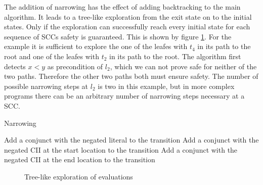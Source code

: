 The addition of narrowing has the effect of adding backtracking to the main algorithm.
It leads to a tree-like exploration from the exit state on to the initial states.
Only if the exploration can successfully reach every initial state for each sequence of SCCs safety is guaranteed.
This is shown by figure \ref{fig:backtrack}.
For the example it is sufficient to explore the one of the leafes with $t_4$ in its path to the root and one of the leafes with $t_2$ in its path to the root.
The algorithm first detects $x < y$ as precondition of $l_2$, which we can not prove safe for neither of the two paths.
Therefore the other two paths both must ensure safety.
The number of possible narrowing steps at $l_2$ is two in this example, but in more complex programs there can be an arbitrary number of narrowing steps necessary at a SCC.

\begin{algorithm}
\caption{Narrowing}\label{narrowing}
\begin{algorithmic}[1]
        \State Add a conjunct with the negated literal to the transition
      \EndIf
    \EndFor
  \EndFor
    \State Add a conjunct with the negated CII at the start location to the transition
    \State Add a conjunct with the negated CII at the end location to the transition
  \EndFor
\end{algorithmic}
\end{algorithm}


\begin{figure}
\centering
{}
\caption{Tree-like exploration of evaluations}
\label{fig:backtrack}
\end{figure}

